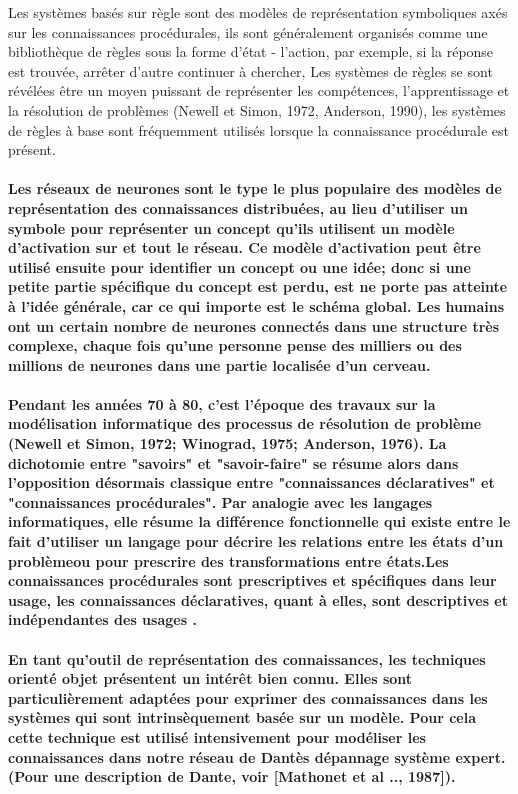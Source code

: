 \documentclass[12pt,a4paper]{report}
\begin{document}
{Les systèmes basés sur règle sont des modèles de représentation symboliques axés sur les connaissances procédurales, ils sont généralement organisés comme une bibliothèque de règles sous la forme d'état - l'action, par exemple, si la réponse est trouvée, arrêter d'autre continuer à chercher, Les systèmes de règles se sont révélées être un moyen puissant de représenter les compétences, l'apprentissage et la résolution de problèmes (Newell et Simon, 1972, Anderson, 1990), les systèmes de règles à base sont fréquemment utilisés lorsque la connaissance procédurale est présent.}\paragraph{\normalfont
Les réseaux de neurones sont le type le plus populaire des modèles de représentation des connaissances distribuées, au lieu d'utiliser un symbole pour représenter un concept qu'ils utilisent un modèle d'activation sur et tout le réseau. Ce modèle d'activation peut être utilisé ensuite pour identifier un concept ou une idée; donc si une petite partie spécifique du concept est perdu, est ne porte pas atteinte à l'idée générale, car ce qui importe est le schéma global. Les humains ont un certain nombre de neurones connectés dans une structure très complexe, chaque fois qu'une personne pense des milliers ou des millions de neurones dans une partie localisée d’un cerveau.}\paragraph{\normalfont
Pendant les années 70 à 80, c'est l'époque des travaux sur la modélisation informatique des processus de résolution de problème (Newell et Simon, 1972; Winograd, 1975; Anderson, 1976). La dichotomie entre "savoirs" et "savoir-faire" se résume alors dans l'opposition désormais classique entre "connaissances déclaratives" et "connaissances procédurales". Par analogie avec les langages informatiques, elle résume la différence fonctionnelle qui existe entre le fait d'utiliser un langage pour décrire les relations entre les états d'un problèmeou pour prescrire des transformations entre états.Les connaissances procédurales sont prescriptives et spécifiques dans leur usage, les connaissances déclaratives, quant à elles, sont descriptives et indépendantes des usages \cite{BLO}.}\paragraph{\normalfont
En tant qu'outil de représentation des connaissances, les techniques orienté objet présentent un intérêt bien connu. Elles sont particulièrement adaptées pour exprimer des connaissances dans les systèmes qui sont intrinsèquement basée sur un modèle. Pour cela  cette technique est  utilisé intensivement pour modéliser les connaissances dans notre réseau de Dantès dépannage système expert. (Pour une description de Dante, voir [Mathonet et al .., 1987]).}\paragraph{\normalfont
}
\end{document}
